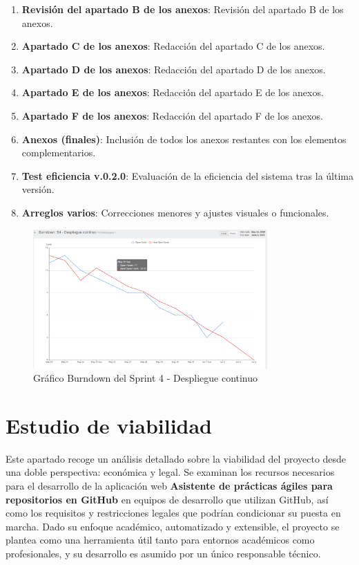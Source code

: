 \begin{enumerate}
\item \textbf{Revisión del apartado B de los anexos}: Revisión del apartado B de los anexos.
\item \textbf{Apartado C de los anexos}: Redacción del apartado C de los anexos.
\item \textbf{Apartado D de los anexos}: Redacción del apartado D de los anexos.
\item \textbf{Apartado E de los anexos}: Redacción del apartado E de los anexos.
\item \textbf{Apartado F de los anexos}: Redacción del apartado F de los anexos.
\item \textbf{Anexos (finales)}: Inclusión de todos los anexos restantes con los elementos complementarios.
\item \textbf{Test eficiencia v.0.2.0}: Evaluación de la eficiencia del sistema tras la última versión.
\item \textbf{Arreglos varios}: Correcciones menores y ajustes visuales o funcionales.
\end{enumerate}

\begin{figure}[H]
\centering
\includegraphics[width=0.8\textwidth]{img/BurndownS4.png}
\caption{Gráfico Burndown del Sprint 4 - Despliegue continuo}
\label{fig:BurndownS4}
\end{figure}

\section{Estudio de viabilidad}

Este apartado recoge un análisis detallado sobre la viabilidad del proyecto desde una doble perspectiva: económica y legal. Se examinan los recursos necesarios para el desarrollo de la aplicación web \textbf{Asistente de prácticas ágiles para repositorios en GitHub} en equipos de desarrollo que utilizan GitHub, así como los requisitos y restricciones legales que podrían condicionar su puesta en marcha. Dado su enfoque académico, automatizado y extensible, el proyecto se plantea como una herramienta útil tanto para entornos académicos como profesionales, y su desarrollo es asumido por un único responsable técnico.

